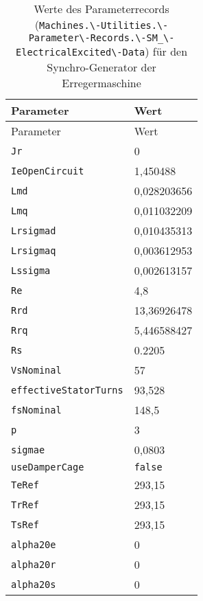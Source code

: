 \begin{longtable}[]{@{}ll@{}}
\caption{Werte des Parameterrecords
(\texttt{Machines.\textbackslash{}-Utilities.\textbackslash{}-Parameter\textbackslash{}-Records.\textbackslash{}-SM\_\textbackslash{}-ElectricalExcited\textbackslash{}-Data})
für den Synchro-Generator der Erregermaschine}\tabularnewline
\toprule
Parameter & Wert\tabularnewline
\midrule
\endfirsthead
\toprule
Parameter & Wert\tabularnewline
\midrule
\endhead
\texttt{Jr} & 0\tabularnewline
\texttt{IeOpenCircuit} & 1,450488\tabularnewline
\texttt{Lmd} & 0,028203656\tabularnewline
\texttt{Lmq} & 0,011032209\tabularnewline
\texttt{Lrsigmad} & 0,010435313\tabularnewline
\texttt{Lrsigmaq} & 0,003612953\tabularnewline
\texttt{Lssigma} & 0,002613157\tabularnewline
\texttt{Re} & 4,8\tabularnewline
\texttt{Rrd} & 13,36926478\tabularnewline
\texttt{Rrq} & 5,446588427\tabularnewline
\texttt{Rs} & 0.2205\tabularnewline
\texttt{VsNominal} & 57\tabularnewline
\texttt{effectiveStatorTurns} & 93,528\tabularnewline
\texttt{fsNominal} & 148,5\tabularnewline
\texttt{p} & 3\tabularnewline
\texttt{sigmae} & 0,0803\tabularnewline
\texttt{useDamperCage} & \texttt{false}\tabularnewline
\texttt{TeRef} & 293,15\tabularnewline
\texttt{TrRef} & 293,15\tabularnewline
\texttt{TsRef} & 293,15\tabularnewline
\texttt{alpha20e} & 0\tabularnewline
\texttt{alpha20r} & 0\tabularnewline
\texttt{alpha20s} & 0\tabularnewline
\bottomrule
\end{longtable}

